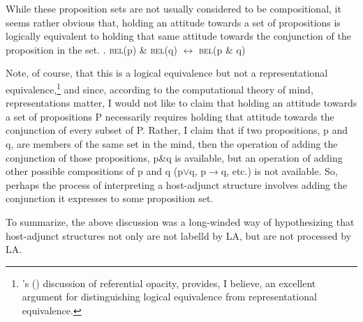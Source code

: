 \documentclass[MilwayThesis]{subfiles}
\begin{document}
While these proposition sets are not usually considered to be compositional, it seems rather obvious that, holding an attitude towards a set of propositions is logically equivalent to holding that same attitude towards the conjunction of the proposition in the set.
\ex. \textsc{bel}(p) \& \textsc{bel}(q) $\leftrightarrow$ \textsc{bel}(p \& q)

Note, of course, that this is a logical equivalence but not a representational equivalence,\footnote{
	\citeauthor{fodor1975language}'s (\citeyear[50--100]{fodor2010lot}) discussion of referential opacity, provides, I believe, an excellent argument for distinguishing logical equivalence from representational equivalence.
} and since, according to the computational theory of mind, representations matter, I would not like to claim that holding an attitude towards a set of propositions P necessarily requires holding that attitude towards the conjunction of every subset of P.
Rather, I claim that if two propositions, p and q, are members of the same set in the mind, then the operation of adding the conjunction of those propositions, p\&q is available, but an operation of adding other possible compositions of p and q (p$\vee$q, p$\rightarrow$q, etc.) is not available.
So, perhaps the process of interpreting a host-adjunct structure involves adding the conjunction it expresses to some proposition set.

To summarize, the above discussion was a long-winded way of hypothesizing that host-adjunct structures not only are not labelld by LA, but are not processed by LA.
\end{document}
